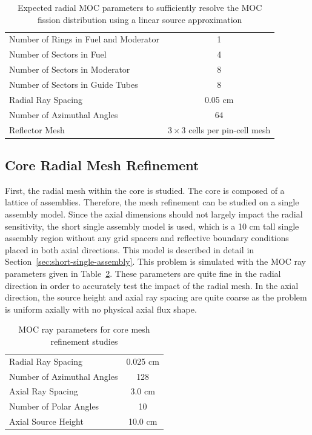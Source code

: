 \begin{table}[ht]
	\centering
	\caption{Expected radial MOC parameters to sufficiently resolve the \ac{MOC} fission distribution using a linear source approximation}
	\medskip
	\begin{tabular}{lc}
		\hline
		Number of Rings in Fuel and Moderator & 1 \\
		Number of Sectors in Fuel & 4 \\
		Number of Sectors in Moderator & 8 \\
		Number of Sectors in Guide Tubes & 8 \\	
		Radial Ray Spacing & 0.05 cm \\
		Number of Azimuthal Angles & 64 \\
		Reflector Mesh & $3 \times 3$ cells per pin-cell mesh \\
		\hline
	\end{tabular}
	\label{tab:expected-radial-params}
\end{table}

\subsection{Core Radial Mesh Refinement}

First, the radial mesh within the core is studied. The core is composed of a lattice of assemblies. Therefore, the mesh refinement can be studied on a single assembly model. Since the axial dimensions should not largely impact the radial sensitivity, the short single assembly model is used, which is a 10 cm tall single assembly region without any grid spacers and reflective boundary conditions placed in both axial directions. This model is described in detail in Section~\ref{sec:short-single-assembly}. This problem is simulated with the \ac{MOC} ray parameters given in Table~\ref{tab:rad-mesh-refinement-params}. These parameters are quite fine in the radial direction in order to accurately test the impact of the radial mesh. In the axial direction, the source height and axial ray spacing are quite coarse as the problem is uniform axially with no physical axial flux shape.

\begin{table}[ht]
	\centering
	\caption{MOC ray parameters for core mesh refinement studies}
	\medskip
	\begin{tabular}{lc}
		\hline
		Radial Ray Spacing & 0.025 cm \\
		Number of Azimuthal Angles & 128 \\
		Axial Ray Spacing & 3.0 cm \\
		Number of Polar Angles & 10 \\
		Axial Source Height & 10.0 cm \\
		\hline
	\end{tabular}
	\label{tab:rad-mesh-refinement-params}
\end{table}

